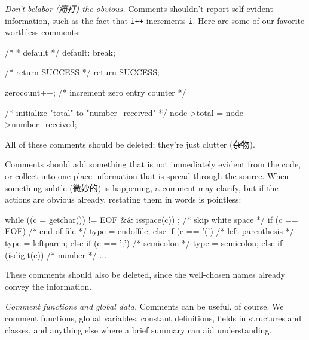 \emph{Don't belabor (痛打) the obvious.} Comments shouldn't report
self-evident information, such as the fact that \verb'i++' increments
\verb'i'. Here are some of our favorite worthless comments:
\begin{badcode}
    /* 
     * default 
     */
    default:
        break;
\end{badcode}
\begin{badcode}
    /* return SUCCESS */
    return SUCCESS;
\end{badcode}
\begin{badcode}
    zerocount++;    /* increment zero entry counter */
\end{badcode}
\begin{badcode}
    /* initialize "total" to "number_received" */
    node->total = node->number_received;
\end{badcode}
All of these comments should be deleted; they're just clutter (杂物).

Comments should add something that is not immediately evident from the code,
or collect into one place information that is spread through the source.
When something subtle (微妙的) is happening, a comment may clarify, but if
the actions are obvious already, restating them in words is pointless:
\begin{badcode}
    while ((c = getchar()) != EOF && isspace(c))
        ;   /* skip white space */
    if (c == EOF)   /* end of file */
        type = endoffile;
    else if (c == '(')  /* left parenthesis */
        type = leftparen;
    else if (c == ';')  /* semicolon */
        type = semicolon;
    else if (isdigit(c))    /* number */
        ...
\end{badcode}
These comments should also be deleted, since the well-chosen names already
convey the information.

\emph{Comment functions and global data.} Comments can be useful, of
course. We comment functions, global variables, constant definitions,
fields in structures and classes, and anything else where a brief summary
can aid understanding.

